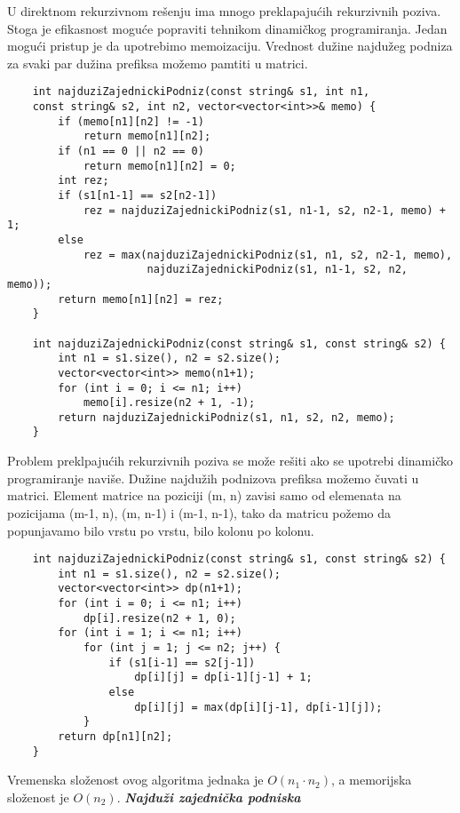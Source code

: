 \documentclass{article}
\begin{document}
U direktnom rekurzivnom rešenju ima mnogo preklapajućih rekurzivnih poziva.
Stoga je efikasnost moguće popraviti tehnikom dinamičkog programiranja. Jedan
mogući pristup je da upotrebimo memoizaciju. Vrednost dužine najdužeg podniza
za svaki par dužina prefiksa možemo pamtiti u matrici.
\begin{lstlisting}
    int najduziZajednickiPodniz(const string& s1, int n1,
    const string& s2, int n2, vector<vector<int>>& memo) {
        if (memo[n1][n2] != -1)
            return memo[n1][n2];
        if (n1 == 0 || n2 == 0)
            return memo[n1][n2] = 0;
        int rez;
        if (s1[n1-1] == s2[n2-1])
            rez = najduziZajednickiPodniz(s1, n1-1, s2, n2-1, memo) + 1;
        else
            rez = max(najduziZajednickiPodniz(s1, n1, s2, n2-1, memo),
                      najduziZajednickiPodniz(s1, n1-1, s2, n2, memo));
        return memo[n1][n2] = rez;
    }

    int najduziZajednickiPodniz(const string& s1, const string& s2) {
        int n1 = s1.size(), n2 = s2.size();
        vector<vector<int>> memo(n1+1);
        for (int i = 0; i <= n1; i++)
            memo[i].resize(n2 + 1, -1);
        return najduziZajednickiPodniz(s1, n1, s2, n2, memo);
    }
\end{lstlisting}
Problem preklpajućih rekurzivnih poziva se može rešiti ako se upotrebi dinamičko
programiranje naviše. Dužine najdužih podnizova prefiksa možemo čuvati u matrici. Element matrice na poziciji (m, n) zavisi samo od elemenata na pozicijama (m-1, n), (m, n-1) i (m-1, n-1), tako da matricu požemo da popunjavamo
bilo vrstu po vrstu, bilo kolonu po kolonu.
\begin{lstlisting}
    int najduziZajednickiPodniz(const string& s1, const string& s2) {
        int n1 = s1.size(), n2 = s2.size();
        vector<vector<int>> dp(n1+1);
        for (int i = 0; i <= n1; i++)
            dp[i].resize(n2 + 1, 0);
        for (int i = 1; i <= n1; i++)
            for (int j = 1; j <= n2; j++) {
                if (s1[i-1] == s2[j-1])
                    dp[i][j] = dp[i-1][j-1] + 1;
                else
                    dp[i][j] = max(dp[i][j-1], dp[i-1][j]);
            }
        return dp[n1][n2];
    }
\end{lstlisting}
Vremenska složenost ovog algoritma jednaka je $O(n_1\cdot n_2)$, a memorijska složenost je $O(n_2)$.
\vspace{0.4cm}\newline
\textit{\textbf{Najduži zajednička podniska}}
\vspace{0.3cm}\newline
\end{document}

